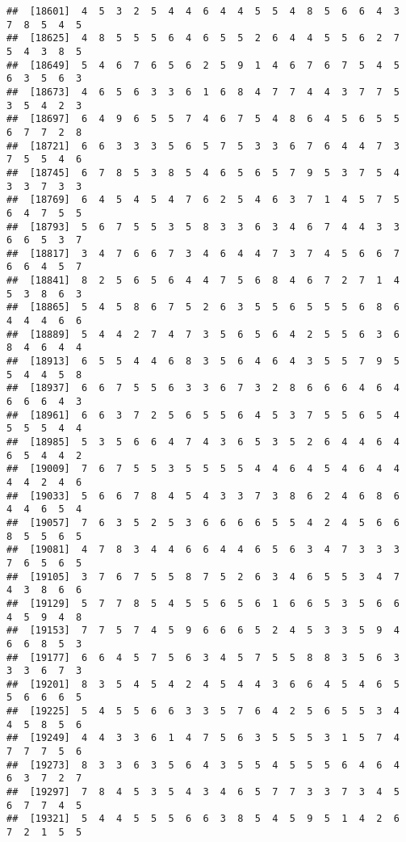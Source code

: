 \documentclass[
]{book}
\begin{document}
\begin{verbatim}
##  [18601]  4  5  3  2  5  4  4  6  4  4  5  5  4  8  5  6  6  4  3  7  8  5  4  5
##  [18625]  4  8  5  5  5  6  4  6  5  5  2  6  4  4  5  5  6  2  7  5  4  3  8  5
##  [18649]  5  4  6  7  6  5  6  2  5  9  1  4  6  7  6  7  5  4  5  6  3  5  6  3
##  [18673]  4  6  5  6  3  3  6  1  6  8  4  7  7  4  4  3  7  7  5  3  5  4  2  3
##  [18697]  6  4  9  6  5  5  7  4  6  7  5  4  8  6  4  5  6  5  5  6  7  7  2  8
##  [18721]  6  6  3  3  3  5  6  5  7  5  3  3  6  7  6  4  4  7  3  7  5  5  4  6
##  [18745]  6  7  8  5  3  8  5  4  6  5  6  5  7  9  5  3  7  5  4  3  3  7  3  3
##  [18769]  6  4  5  4  5  4  7  6  2  5  4  6  3  7  1  4  5  7  5  6  4  7  5  5
##  [18793]  5  6  7  5  5  3  5  8  3  3  6  3  4  6  7  4  4  3  3  6  6  5  3  7
##  [18817]  3  4  7  6  6  7  3  4  6  4  4  7  3  7  4  5  6  6  7  6  6  4  5  7
##  [18841]  8  2  5  6  5  6  4  4  7  5  6  8  4  6  7  2  7  1  4  5  3  8  6  3
##  [18865]  5  4  5  8  6  7  5  2  6  3  5  5  6  5  5  5  6  8  6  4  4  4  6  6
##  [18889]  5  4  4  2  7  4  7  3  5  6  5  6  4  2  5  5  6  3  6  8  4  6  4  4
##  [18913]  6  5  5  4  4  6  8  3  5  6  4  6  4  3  5  5  7  9  5  5  4  4  5  8
##  [18937]  6  6  7  5  5  6  3  3  6  7  3  2  8  6  6  6  4  6  4  6  6  6  4  3
##  [18961]  6  6  3  7  2  5  6  5  5  6  4  5  3  7  5  5  6  5  4  5  5  5  4  4
##  [18985]  5  3  5  6  6  4  7  4  3  6  5  3  5  2  6  4  4  6  4  6  5  4  4  2
##  [19009]  7  6  7  5  5  3  5  5  5  5  4  4  6  4  5  4  6  4  4  4  4  2  4  6
##  [19033]  5  6  6  7  8  4  5  4  3  3  7  3  8  6  2  4  6  8  6  4  4  6  5  4
##  [19057]  7  6  3  5  2  5  3  6  6  6  6  5  5  4  2  4  5  6  6  8  5  5  6  5
##  [19081]  4  7  8  3  4  4  6  6  4  4  6  5  6  3  4  7  3  3  3  7  6  5  6  5
##  [19105]  3  7  6  7  5  5  8  7  5  2  6  3  4  6  5  5  3  4  7  4  3  8  6  6
##  [19129]  5  7  7  8  5  4  5  5  6  5  6  1  6  6  5  3  5  6  6  4  5  9  4  8
##  [19153]  7  7  5  7  4  5  9  6  6  6  5  2  4  5  3  3  5  9  4  6  6  8  5  3
##  [19177]  6  6  4  5  7  5  6  3  4  5  7  5  5  8  8  3  5  6  3  3  3  6  7  3
##  [19201]  8  3  5  4  5  4  2  4  5  4  4  3  6  6  4  5  4  6  5  5  6  6  6  5
##  [19225]  5  4  5  5  6  6  3  3  5  7  6  4  2  5  6  5  5  3  4  4  5  8  5  6
##  [19249]  4  4  3  3  6  1  4  7  5  6  3  5  5  5  3  1  5  7  4  7  7  7  5  6
##  [19273]  8  3  3  6  3  5  6  4  3  5  5  4  5  5  5  6  4  6  4  6  3  7  2  7
##  [19297]  7  8  4  5  3  5  4  3  4  6  5  7  7  3  3  7  3  4  5  6  7  7  4  5
##  [19321]  5  4  4  5  5  5  6  6  3  8  5  4  5  9  5  1  4  2  6  7  2  1  5  5

\end{verbatim}
\end{document}
